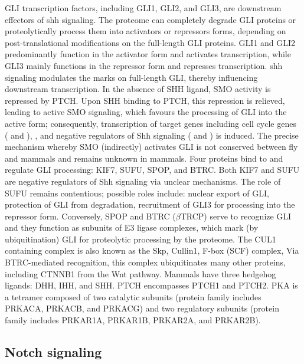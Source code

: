 		GLI transcription factors, including GLI1, GLI2, and GLI3, are downstream effectors of \gls{shh} signaling. The proteome can completely degrade GLI proteins or proteolytically process them into activators or repressors forms, depending on post-translational modifications on the full-length GLI proteins. GLI1 and GLI2 predominantly function in the activator form and activates transcription, while GLI3 mainly functions in the repressor form and represses transcription. \gls{shh} signaling modulates the marks on full-length GLI, thereby influencing downstream transcription.
		In the absence of SHH ligand, SMO activity is repressed by PTCH. Upon SHH binding to PTCH, this repression is relieved, leading to active SMO signaling, which favours the processing of GLI into the active form; consequently, transcription of target genes including cell cycle genes ( and ), , and negative regulators of Shh signaling ( and ) is induced.
		The precise mechanism whereby SMO (indirectly) activates GLI is not conserved between fly and mammals and remains unknown in mammals. Four proteins bind to and regulate GLI processing: KIF7, SUFU, SPOP, and BTRC. Both KIF7 and SUFU are negative regulators of Shh signaling via unclear mechanisms. The role of SUFU remains contentious; possible roles include: nuclear export of GLI, protection of GLI from degradation, recruitment of GLI3 for processing into the repressor form. Conversely, SPOP and BTRC ($\beta$TRCP) serve to recognize GLI and they function as subunits of E3 ligase complexes, which mark (by ubiquitination) GLI for proteolytic processing by the proteome. The CUL1 containing complex is also known as the Skp, Cullin1, F-box (SCF) complex, Via BTRC-mediated recognition, this complex ubiquitinates many other proteins, including CTNNB1 from the Wnt pathway.
		Mammals have three hedgehog ligands: DHH, IHH, and SHH. PTCH encompasses PTCH1 and PTCH2. PKA is a tetramer composed of two catalytic subunits (protein family includes PRKACA, PRKACB, and PRKACG) and two regulatory subunits (protein family includes PRKAR1A, PRKAR1B, PRKAR2A, and PRKAR2B).


\subsection{Notch signaling}

